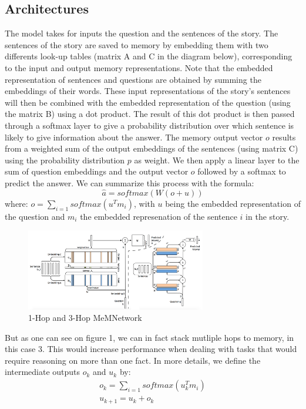 \documentclass[twoside,11pt]{article}
\begin{document}
\subsection{Architectures}

The model takes for inputs the question and the sentences of the story. The sentences of the story are saved to memory by embedding them with two differents look-up tables (matrix A and C in the diagram below), corresponding to the input and output memory representations. Note that the embedded representation of sentences and questions are obtained by summing the embeddings of their words. These input representations of the story's sentences will then be combined with the embedded representation of the question (using the matrix B) using a dot product. The result of this dot product is then passed through a softmax layer to give a probability distribution over which sentence is likely to give information about the answer. The memory output vector $o$ results from a weighted sum of the output embeddings of the sentences (using matrix C) using the probability distribution $p$ as weight. We then apply a linear layer to the sum of question embeddings and the output vector $o$ followed by a softmax to predict the answer. We can summarize this process with the formula: $$\hat{a} = softmax\left(W(o+u)\right)$$
where: $ o = \sum\limits_{i=1}softmax(u^Tm_i)$, with $u$ being the embedded representation of the question and $m_i$ the embedded represenation of the sentence $i$ in the story.\\

\begin{figure}[H]
\begin{center}
    \includegraphics[width=0.7\textwidth]{mem.png}
    \caption{1-Hop and 3-Hop  MeMNetwork}
\end{center}
\end{figure}

\noindent But as one can see on figure 1, we can in fact stack mutliple hops to memory, in this case 3. This would increase performance when dealing with tasks that would require reasoning on more than one fact. In more details, we define the intermediate outputs $o_k$ and $u_k$ by:
\begin{gather*}
o_k  = \sum\limits_{i=1}softmax(u_k^Tm_i) \\
u_{k+1}  = u_k + o_k
\end{gather*} 
\end{document}
